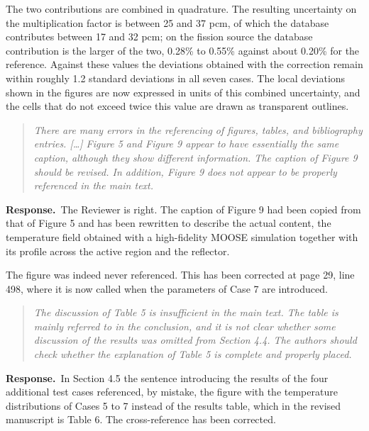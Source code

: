 \documentclass[11pt]{article}
\newenvironment{reviewer}%
  {\medskip\begin{quote}\itshape\color{black!70}}%
  {\end{quote}}
\newcommand{\answer}{\textbf{Response.}\ }
\begin{document}
The two contributions are combined in quadrature. The resulting uncertainty on the multiplication factor is between 25 and 37 pcm, of which the database contributes between 17 and 32 pcm; on the fission source the database contribution is the larger of the two, 0.28\% to 0.55\% against about 0.20\% for the reference. Against these values the deviations obtained with the correction remain within roughly 1.2 standard deviations in all seven cases. The local deviations shown in the figures are now expressed in units of this combined uncertainty, and the cells that do not exceed twice this value are drawn as transparent outlines.
\begin{reviewer}
There are many errors in the referencing of figures, tables, and bibliography entries. [\ldots] Figure 5 and Figure 9 appear to have essentially the same caption, although they show different information. The caption of Figure 9 should be revised. In addition, Figure 9 does not appear to be properly referenced in the main text.
\end{reviewer}

\answer The Reviewer is right. The caption of Figure 9 had been copied from that of Figure 5 and has been rewritten to describe the actual content, the temperature field obtained with a high-fidelity MOOSE simulation together with its profile across the active region and the reflector.

The figure was indeed never referenced. This has been corrected at page 29, line 498, where it is now called when the parameters of Case 7 are introduced.
\begin{reviewer}
The discussion of Table 5 is insufficient in the main text. The table is mainly referred to in the conclusion, and it is not clear whether some discussion of the results was omitted from Section 4.4. The authors should check whether the explanation of Table 5 is complete and properly placed.
\end{reviewer}

\answer In Section 4.5 the sentence introducing the results of the four additional test cases referenced, by mistake, the figure with the temperature distributions of Cases 5 to 7 instead of the results table, which in the revised manuscript is Table 6. The cross-reference has been corrected.
\end{document}
